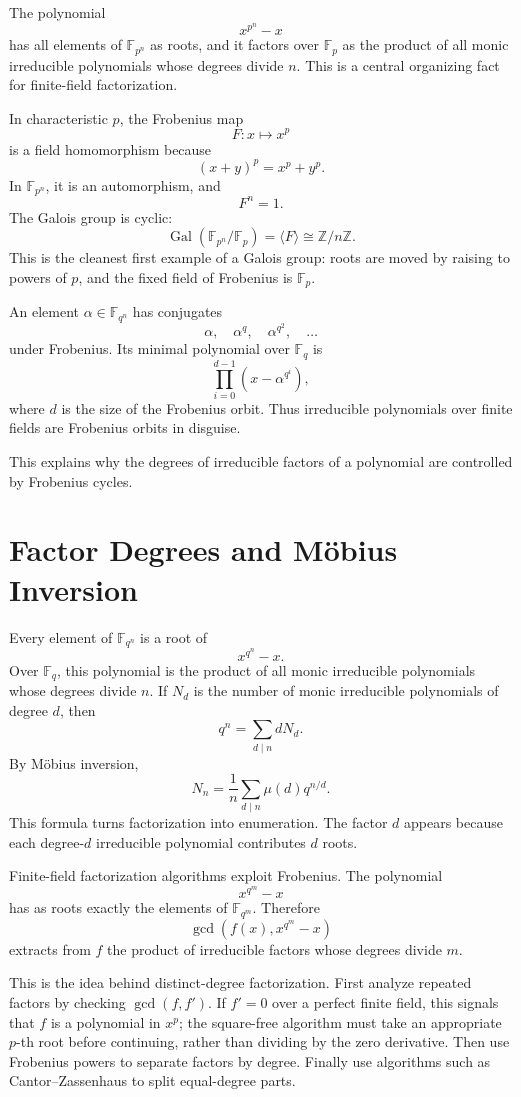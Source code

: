The polynomial
\[
  x^{p^n}-x
\]
has all elements of \(\mathbb F_{p^n}\) as roots, and it factors over \(\mathbb F_p\) as the product of all monic irreducible polynomials whose degrees divide \(n\).  This is a central organizing fact for finite-field factorization.

In characteristic \(p\), the Frobenius map
\[
  F:x\mapsto x^p
\]
is a field homomorphism because
\[
  (x+y)^p=x^p+y^p.
\]
In \(\mathbb F_{p^n}\), it is an automorphism, and
\[
  F^n=1.
\]
The Galois group is cyclic:
\[
  \operatorname{Gal}(\mathbb F_{p^n}/\mathbb F_p)
  =\langle F\rangle\cong \mathbb Z/n\mathbb Z.
\]
This is the cleanest first example of a Galois group: roots are moved by raising to powers of \(p\), and the fixed field of Frobenius is \(\mathbb F_p\).

An element \(\alpha\in\mathbb F_{q^n}\) has conjugates
\[
  \alpha,\quad \alpha^q,\quad \alpha^{q^2},\quad\ldots
\]
under Frobenius.  Its minimal polynomial over \(\mathbb F_q\) is
\[
  \prod_{i=0}^{d-1}(x-\alpha^{q^i}),
\]
where \(d\) is the size of the Frobenius orbit.  Thus irreducible polynomials over finite fields are Frobenius orbits in disguise.

This explains why the degrees of irreducible factors of a polynomial are controlled by Frobenius cycles.

\section{Factor Degrees and Möbius Inversion}

Every element of \(\mathbb F_{q^n}\) is a root of
\[
  x^{q^n}-x.
\]
Over \(\mathbb F_q\), this polynomial is the product of all monic irreducible polynomials whose degrees divide \(n\).  If \(N_d\) is the number of monic irreducible polynomials of degree \(d\), then
\[
  q^n=\sum_{d\mid n}dN_d.
\]
By Möbius inversion,
\[
  N_n=\frac1n\sum_{d\mid n}\mu(d)q^{n/d}.
\]
This formula turns factorization into enumeration.  The factor \(d\) appears because each degree-\(d\) irreducible polynomial contributes \(d\) roots.

Finite-field factorization algorithms exploit Frobenius.  The polynomial
\[
  x^{q^m}-x
\]
has as roots exactly the elements of \(\mathbb F_{q^m}\).  Therefore
\[
  \gcd(f(x),x^{q^m}-x)
\]
extracts from \(f\) the product of irreducible factors whose degrees divide \(m\).

This is the idea behind distinct-degree factorization.  First analyze repeated factors by checking \(\gcd(f,f')\). If \(f'=0\) over a perfect finite field, this signals that \(f\) is a polynomial in \(x^p\); the square-free algorithm must take an appropriate \(p\)-th root before continuing, rather than dividing by the zero derivative.  Then use Frobenius powers to separate factors by degree.  Finally use algorithms such as Cantor--Zassenhaus to split equal-degree parts.


